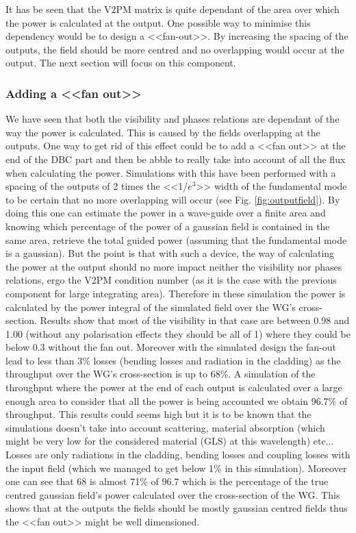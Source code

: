It has be seen that the V2PM matrix is quite dependant of the area
over which the power is calculated at the output. One possible way to
minimise this dependency would be to design a <<fan-out>>. By
increasing the spacing of the outputs, the field should be more
centred and no overlapping would occur at the output. The next section
will focus on this component.

\subsubsection{Adding a <<fan out>>}
We have seen that both the visibility and phases relations are
dependant of the way the power is calculated. This is caused by the
fields overlapping at the outputs. One way to get rid of this effect
could be to add a <<fan out>> at the end of the DBC part and then be abble to really take into account of all the flux when calculating the power. Simulations
with this have been performed with a spacing of the outputs of 2 times
the <<1/$e^3$>> width of the fundamental mode to be certain that no
more overlapping will occur (see Fig. \ref{fig:outputfield}). By doing this one can estimate the
power in a wave-guide over a finite area and knowing which percentage
of the power of a gaussian field is contained in the same area,
retrieve the total guided power (assuming that the fundamental mode is a gaussian). But the point is that with such a
device, the way of calculating the power at the output should no more
impact neither the visibility nor phases relations, ergo the V2PM condition number (as it is the case with the previous component for large integrating area).
Therefore in these simulation the power is calculated by the power
integral of the simulated field over the WG's cross-section.
Results show that most of the visibility in that case are between
0.98 and 1.00 (without any polarisation effects they should be all of
1) where they could be below 0.3 without the fan out.
Moreover with the simulated design the fan-out lead to less than 3\%
losses (bending losses and radiation in the cladding) as the
throughput over the WG's cross-section is up to 68\%.
A simulation of the throughput where the power at the end of each
output is calculated over a large enough area to consider that all the
power is being accounted we obtain 96.7\% of throughput. This results
could seems high but it is to be known that the simulations doesn't
take into account scattering, material absorption (which might be very
low for the considered material (GLS) at this wavelength) etc... Losses are only radiations in
the cladding, bending losses and coupling losses with the input field
(which we managed to get below 1\% in this simulation).
Moreover one can see that 68 is almost 71\% of 96.7 which is the
percentage of the true centred gaussian field's power calculated over
the cross-section of the WG. This shows that at the outputs the fields
should be mostly gaussian centred fields thus the <<fan out>> might be well dimensioned.


